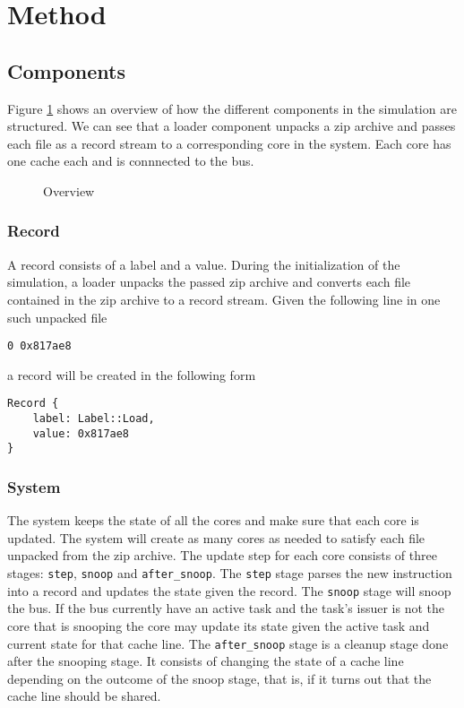 \section{Method}

\subsection{Components}
Figure \ref{fig:overview} shows an overview of how the different components in the simulation are
structured. We can see that a loader component unpacks a zip archive and passes each file as a
record stream to a corresponding core in the system. Each core has one cache each and is connnected
to the bus.

\begin{figure}[ht]
    \centering
    \caption{Overview}
    \label{fig:overview}
\end{figure}



\subsubsection{Record}

A record consists of a label and a value.  During the initialization of the simulation, a loader
unpacks the passed zip archive and converts each file contained in the zip archive to a record
stream.  Given the following line in one such unpacked file
\begin{lstlisting}
0 0x817ae8
\end{lstlisting}
a record will be created in the following form
\begin{lstlisting}
Record {
    label: Label::Load,
    value: 0x817ae8
}
\end{lstlisting}


\subsubsection{System}
The system keeps the state of all the cores and make sure that each core is updated.  The system
will create as many cores as needed to satisfy each file unpacked from the zip archive.  The update
step for each core consists of three stages: \texttt{step}, \texttt{snoop} and
\texttt{after\_snoop}.  The \texttt{step} stage parses the new instruction into a record and updates
the state given the record.  The \texttt{snoop} stage will snoop the bus.  If the bus currently have
an active task and the task's issuer is not the core that is snooping the core may update its state
given the active task and current state for that cache line.  The \texttt{after\_snoop} stage is a
cleanup stage done after the snooping stage.  It consists of changing the state of a cache line
depending on the outcome of the snoop stage, that is, if it turns out that the cache line should be
shared.

